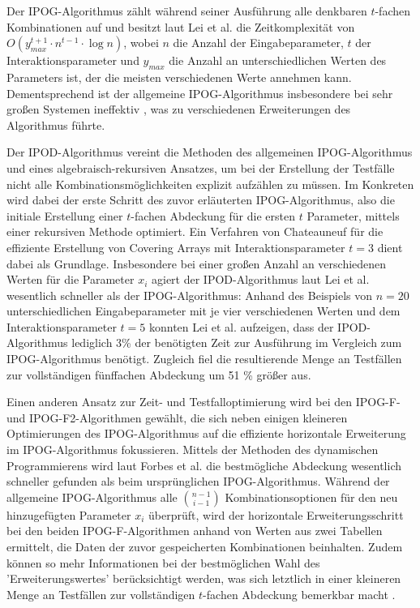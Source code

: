 Der IPOG-Algorithmus zählt während seiner Ausführung alle denkbaren $t$-fachen Kombinationen auf und besitzt laut Lei et al. \cite{lei2008ipog} die Zeitkomplexität von $ O(y_{max}^{t+1} \cdot n^{t-1} \cdot \log n)$, wobei $n$ die Anzahl der Eingabeparameter, $t$ der Interaktionsparameter und $y_{max}$ die Anzahl an unterschiedlichen Werten des Parameters ist, der die meisten verschiedenen Werte annehmen kann. Dementsprechend ist der allgemeine IPOG-Algorithmus insbesondere bei sehr großen Systemen ineffektiv \cite{lei2008ipog}, was zu verschiedenen Erweiterungen des Algorithmus führte. 

Der IPOD-Algorithmus \cite{lei2008ipog} vereint die Methoden des allgemeinen IPOG-Algorithmus und eines algebraisch-rekursiven Ansatzes, um bei der Erstellung der Testfälle nicht alle Kombinationsmöglichkeiten explizit aufzählen zu müssen. Im Konkreten wird dabei der erste Schritt des zuvor erläuterten IPOG-Algorithmus, also die initiale Erstellung einer $t$-fachen Abdeckung für die ersten $t$ Parameter, mittels einer rekursiven Methode optimiert. Ein Verfahren von Chateauneuf \cite{chateauneuf1999covering} für die effiziente Erstellung von Covering Arrays mit Interaktionsparameter $t = 3$ dient dabei als Grundlage. Insbesondere bei einer großen Anzahl an verschiedenen Werten für die Parameter $x_i$ agiert der IPOD-Algorithmus laut Lei et al. \cite{lei2008ipog} wesentlich schneller als der IPOG-Algorithmus: Anhand des Beispiels von $n=20$ unterschiedlichen Eingabeparameter mit je vier verschiedenen Werten und dem Interaktionsparameter $t=5$ konnten Lei et al. aufzeigen, dass der IPOD-Algorithmus lediglich 3\% der benötigten Zeit zur Ausführung im Vergleich zum IPOG-Algorithmus benötigt. Zugleich fiel die resultierende Menge an Testfällen zur vollständigen fünffachen Abdeckung um 51 \% größer aus.

Einen anderen Ansatz zur Zeit- und Testfalloptimierung wird bei den IPOG-F- und IPOG-F2-Algorithmen \cite{forbes2008refining} gewählt, die sich neben einigen kleineren Optimierungen des IPOG-Algorithmus auf die effiziente horizontale Erweiterung im IPOG-Algorithmus fokussieren. Mittels der Methoden des dynamischen Programmierens wird laut Forbes et al. \cite{forbes2008refining} die bestmögliche Abdeckung wesentlich schneller gefunden als beim ursprünglichen IPOG-Algorithmus. Während der allgemeine IPOG-Algorithmus alle $\binom{n-1}{i-1}$ Kombinationsoptionen für den neu hinzugefügten Parameter $x_i$ überprüft, wird der horizontale Erweiterungsschritt bei den beiden IPOG-F-Algorithmen anhand von Werten aus zwei Tabellen ermittelt, die Daten der zuvor gespeicherten Kombinationen beinhalten. Zudem können so mehr Informationen bei der bestmöglichen Wahl des 'Erweiterungswertes' berücksichtigt werden, was sich letztlich in einer kleineren Menge an Testfällen zur vollständigen $t$-fachen Abdeckung bemerkbar macht \cite{forbes2008refining}.

